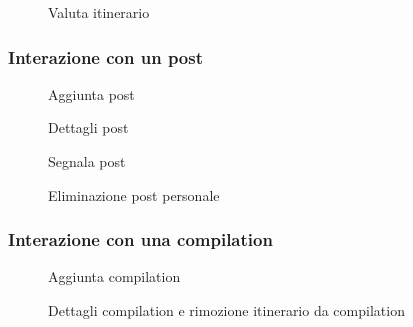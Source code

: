 \documentclass{natourDoc}
\begin{document}
\newpage

\begin{figure}[!htpb]
	\centering
	
	\caption{Valuta itinerario}
\end{figure}
\FloatBarrier

\newpage

\subsubsection{Interazione con un post}
\begin{figure}[!htpb]
	\centering
	
	\caption{Aggiunta post}
\end{figure}
\FloatBarrier

\newpage

\begin{figure}[!htpb]
	\centering
	
	\caption{Dettagli post}
\end{figure}
\FloatBarrier

\begin{figure}[!htpb]
	\centering
	
	\caption{Segnala post}
\end{figure}
\FloatBarrier

\begin{figure}[!htpb]
	\centering
	
	\caption{Eliminazione post personale}
\end{figure}
\FloatBarrier

\newpage

\subsubsection{Interazione con una compilation}
\begin{figure}[!htpb]
	\centering
	
	\caption{Aggiunta compilation}
\end{figure}
\FloatBarrier

\newpage

\begin{figure}[!htpb]
	\centering
	
	\caption{Dettagli compilation e rimozione itinerario da compilation}
\end{figure}
\FloatBarrier
\end{document}

